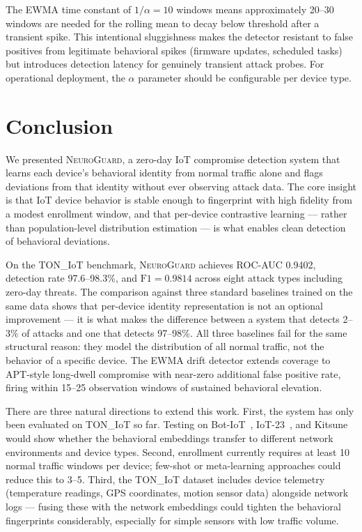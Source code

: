 \documentclass[journal,10pt,twoside]{IEEEtran}
\newcommand{\neuroguard}{\textsc{NeuroGuard}}
\begin{document}
The EWMA time constant of $1/\alpha = 10$ windows means approximately 20--30
windows are needed for the rolling mean to decay below threshold after a
transient spike.
This intentional sluggishness makes the detector resistant to false positives
from legitimate behavioral spikes (firmware updates, scheduled tasks) but
introduces detection latency for genuinely transient attack probes.
For operational deployment, the $\alpha$ parameter should be configurable per
device type.

\section{Conclusion}
\label{sec:conclusion}

We presented \neuroguard{}, a zero-day IoT compromise detection system that
learns each device's behavioral identity from normal traffic alone and flags
deviations from that identity without ever observing attack data.
The core insight is that IoT device behavior is stable enough to fingerprint
with high fidelity from a modest enrollment window, and that per-device
contrastive learning --- rather than population-level distribution estimation
--- is what enables clean detection of behavioral deviations.

On the TON\_IoT benchmark, \neuroguard{} achieves ROC-AUC 0.9402, detection
rate 97.6--98.3\%, and $\text{F1}=0.9814$ across eight attack types including
zero-day threats.
The comparison against three standard baselines trained on the same data shows
that per-device identity representation is not an optional improvement --- it
is what makes the difference between a system that detects 2--3\% of attacks
and one that detects 97--98\%.
All three baselines fail for the same structural reason: they model the
distribution of all normal traffic, not the behavior of a specific device.
The EWMA drift detector extends coverage to APT-style long-dwell compromise
with near-zero additional false positive rate, firing within 15--25 observation
windows of sustained behavioral elevation.

There are three natural directions to extend this work.
First, the system has only been evaluated on TON\_IoT so far.
Testing on Bot-IoT~\cite{koroniotis2019botiot}, IoT-23~\cite{garcia2020iot23},
and Kitsune~\cite{mirsky2018kitsune} would show whether the behavioral
embeddings transfer to different network environments and device types.
Second, enrollment currently requires at least 10 normal traffic windows per
device; few-shot or meta-learning approaches could reduce this to 3--5.
Third, the TON\_IoT dataset includes device telemetry (temperature readings,
GPS coordinates, motion sensor data) alongside network logs ---
fusing these with the network embeddings could tighten the behavioral
fingerprints considerably, especially for simple sensors with low traffic
volume.
\end{document}
